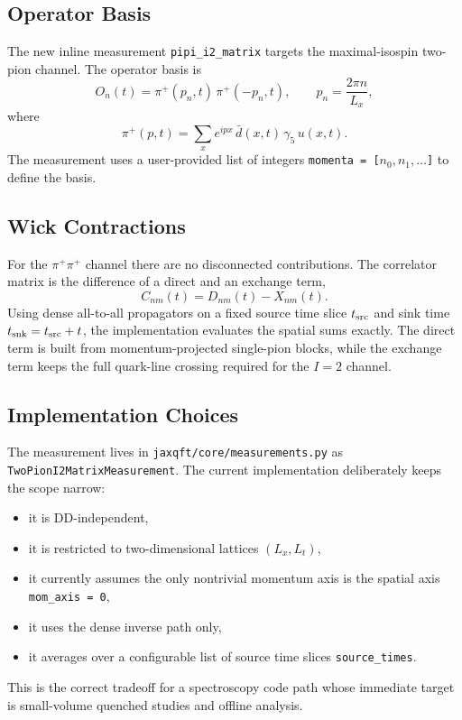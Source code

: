 \documentclass[11pt]{article}
\begin{document}
\subsection{Operator Basis}
The new inline measurement \texttt{pipi\_i2\_matrix} targets the maximal-isospin
two-pion channel. The operator basis is
\begin{equation}
  O_n(t) = \pi^+(p_n,t)\,\pi^+(-p_n,t),
  \qquad
  p_n = \frac{2\pi n}{L_x},
\end{equation}
where
\begin{equation}
  \pi^+(p,t) = \sum_x e^{ipx}\,\bar d(x,t)\,\gamma_5\,u(x,t).
\end{equation}
The measurement uses a user-provided list of integers
\texttt{momenta = [}$n_0,n_1,\dots$\texttt{]} to define the basis.

\subsection{Wick Contractions}
For the $\pi^+\pi^+$ channel there are no disconnected contributions. The
correlator matrix is the difference of a direct and an exchange term,
\begin{equation}
  C_{nm}(t) = D_{nm}(t) - X_{nm}(t).
\end{equation}
Using dense all-to-all propagators on a fixed source time slice $t_{\rm src}$ and
sink time $t_{\rm snk}=t_{\rm src}+t$, the implementation evaluates the spatial
sums exactly. The direct term is built from momentum-projected single-pion
blocks, while the exchange term keeps the full quark-line crossing required for
the $I=2$ channel.

\subsection{Implementation Choices}
The measurement lives in
\texttt{jaxqft/core/measurements.py} as
\texttt{TwoPionI2MatrixMeasurement}. The current implementation deliberately
keeps the scope narrow:
\begin{itemize}
  \item it is DD-independent,
  \item it is restricted to two-dimensional lattices $(L_x,L_t)$,
  \item it currently assumes the only nontrivial momentum axis is the spatial
  axis \texttt{mom\_axis = 0},
  \item it uses the dense inverse path only,
  \item it averages over a configurable list of source time slices
  \texttt{source\_times}.
\end{itemize}
This is the correct tradeoff for a spectroscopy code path whose immediate target
is small-volume quenched studies and offline analysis.
\end{document}
